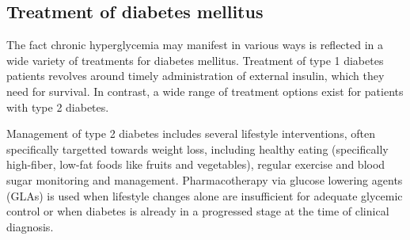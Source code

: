 


\subsection{Treatment of diabetes mellitus} \label{intro:treatment}
The fact chronic hyperglycemia may manifest in various ways is reflected in a wide variety of treatments for diabetes mellitus. Treatment of type 1 diabetes patients revolves around timely administration of external insulin, which they need for survival. In contrast, a wide range of treatment options exist for patients with type 2 diabetes.

Management of type 2 diabetes includes several lifestyle interventions, often specifically targetted towards weight loss, including healthy eating (specifically high-fiber, low-fat foods like fruits and vegetables), regular exercise and blood sugar monitoring and management. Pharmacotherapy via glucose lowering agents (GLAs) is used when lifestyle changes alone are insufficient for adequate glycemic control or when diabetes is already in a progressed stage at the time of clinical diagnosis. 

\newcommand{\regist}[1]{\emph{#1}\textsuperscript{\textregistered}}

